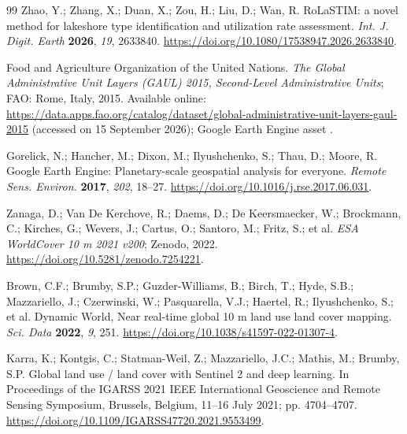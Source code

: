 \documentclass[remotesensing,article,submit,moreauthors]{Definitions/mdpi}
\begin{document}
\begin{thebibliography}{99}
Zhao, Y.; Zhang, X.; Duan, X.; Zou, H.; Liu, D.; Wan, R.
RoLaSTIM: a novel method for lakeshore type identification and utilization rate
assessment. \textit{Int. J. Digit. Earth} \textbf{2026}, \textit{19}, 2633840.
\href{https://doi.org/10.1080/17538947.2026.2633840}{https://doi.org/10.1080/17538947.2026.2633840}.

Food and Agriculture Organization of the United Nations.
\textit{The Global Administrative Unit Layers (GAUL) 2015, Second-Level
Administrative Units}; FAO: Rome, Italy, 2015. Available online:
\url{https://data.apps.fao.org/catalog/dataset/global-administrative-unit-layers-gaul-2015}
(accessed on 15 September 2026);
Google Earth Engine asset \href{https://developers.google.com/earth-engine/datasets/catalog/FAO_GAUL_2015_level2}{}.

Gorelick, N.; Hancher, M.; Dixon, M.; Ilyushchenko, S.; Thau, D.; Moore, R.
Google Earth Engine: Planetary-scale geospatial analysis for everyone.
\textit{Remote Sens. Environ.} \textbf{2017}, \textit{202}, 18--27.
\href{https://doi.org/10.1016/j.rse.2017.06.031}{https://doi.org/10.1016/j.rse.2017.06.031}.

Zanaga, D.; Van De Kerchove, R.; Daems, D.; De Keersmaecker, W.; Brockmann, C.;
Kirches, G.; Wevers, J.; Cartus, O.; Santoro, M.; Fritz, S.; et al.
\textit{ESA WorldCover 10 m 2021 v200}; Zenodo, 2022.
\href{https://doi.org/10.5281/zenodo.7254221}{https://doi.org/10.5281/zenodo.7254221}.

Brown, C.F.; Brumby, S.P.; Guzder-Williams, B.; Birch, T.; Hyde, S.B.;
Mazzariello, J.; Czerwinski, W.; Pasquarella, V.J.; Haertel, R.;
Ilyushchenko, S.; et al. Dynamic World, Near real-time global 10 m land use land
cover mapping. \textit{Sci. Data} \textbf{2022}, \textit{9}, 251.
\href{https://doi.org/10.1038/s41597-022-01307-4}{https://doi.org/10.1038/s41597-022-01307-4}.

Karra, K.; Kontgis, C.; Statman-Weil, Z.; Mazzariello, J.C.; Mathis, M.;
Brumby, S.P. Global land use / land cover with Sentinel 2 and deep learning. In
Proceedings of the IGARSS 2021 IEEE International Geoscience and Remote Sensing
Symposium, Brussels, Belgium, 11--16 July 2021; pp. 4704--4707.
\href{https://doi.org/10.1109/IGARSS47720.2021.9553499}{https://doi.org/10.1109/IGARSS47720.2021.9553499}.


\end{thebibliography}
\end{document}
